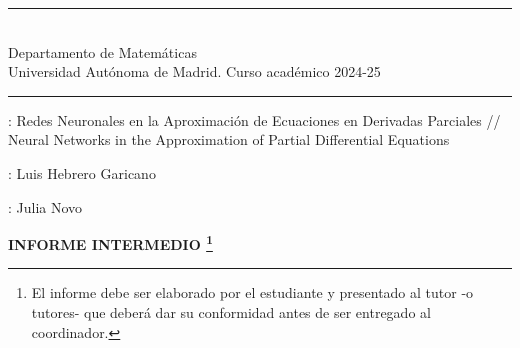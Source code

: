 \documentclass{article}
\begin{document}
\hrule
\vskip 6pt

 \\
Departamento de Matem\'aticas\\
Universidad Aut\'onoma de Madrid. Curso acad\'emico 2024-25\\

\vskip 6pt \hrule

\vskip 5mm

: Redes Neuronales en la Aproximación de Ecuaciones en Derivadas Parciales // Neural Networks in the Approximation of Partial Differential Equations
\vskip 5mm

: Luis Hebrero Garicano

\vskip 5mm

: Julia Novo

\vskip 2cm


\centerline{\bf INFORME INTERMEDIO \footnote{ El informe debe ser elaborado por el estudiante y presentado al tutor -o tutores- que deber\'a dar su conformidad antes de ser entregado al coordinador.}}

\vskip 5mm
\end{document}
